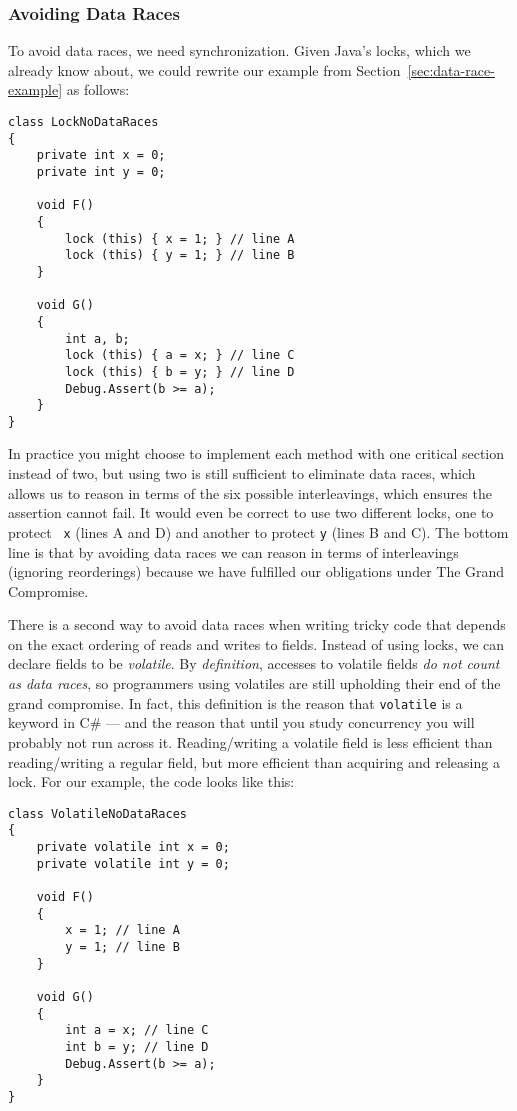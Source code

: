 \documentclass[10pt]{article}
\begin{document}
\subsubsection{Avoiding Data Races}

To avoid data races, we need synchronization.  Given Java's locks,
which we already know about, we could rewrite our example from
Section~\ref{sec:data-race-example} as follows:
\begin{verbatim}
class LockNoDataRaces
{
    private int x = 0;
    private int y = 0;

    void F()
    {
        lock (this) { x = 1; } // line A
        lock (this) { y = 1; } // line B
    }

    void G()
    {
        int a, b;
        lock (this) { a = x; } // line C
        lock (this) { b = y; } // line D
        Debug.Assert(b >= a);
    }
}
\end{verbatim}
In practice you might choose to implement each method with one
critical section instead of two, but using two is still sufficient to
eliminate data races, which allows us to reason in terms of the six
possible interleavings, which ensures the assertion cannot fail.  It
would even be correct to use two different locks, one to protect {\tt
  x} (lines A and D) and another to protect {\tt y} (lines B and C).
The bottom line is that by avoiding data races we can reason in terms
of interleavings (ignoring reorderings) because we have fulfilled our
obligations under The Grand Compromise.

There is a second way to avoid data races when writing tricky code
that depends on the exact ordering of reads and writes to fields.
Instead of using locks, we can declare fields to be \emph{volatile}.
By \emph{definition}, accesses to volatile fields \emph{do not count
  as data races}, so programmers using volatiles are still upholding
their end of the grand compromise.  In fact, this definition is the
reason that {\tt volatile} is a keyword in C\# --- and the reason
that until you study concurrency you will probably not run across it.
Reading/writing a volatile field is less efficient than
reading/writing a regular field, but more efficient than acquiring and
releasing a lock.  For our example, the code looks like this:
\begin{verbatim}
class VolatileNoDataRaces
{
    private volatile int x = 0;
    private volatile int y = 0;

    void F()
    {
        x = 1; // line A
        y = 1; // line B
    }

    void G()
    {
        int a = x; // line C
        int b = y; // line D
        Debug.Assert(b >= a);
    }
}
\end{verbatim}
\end{document}
